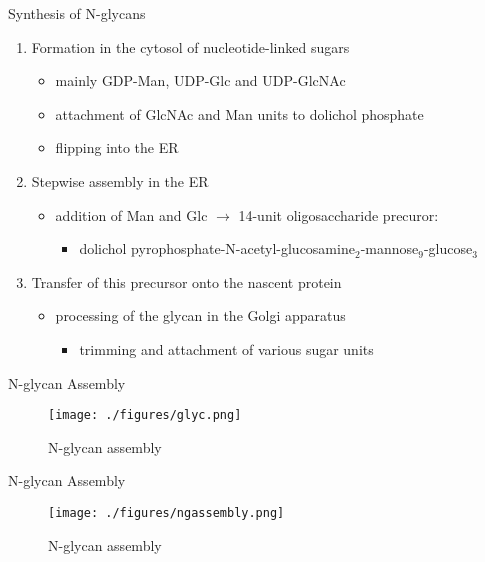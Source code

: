 \documentclass[presentation, smaller]{beamer}
\begin{document}
\begin{frame}[label={sec:orgbd9805b}]{Synthesis of N-glycans}
\begin{enumerate}
\item Formation in the cytosol of nucleotide-linked sugars
\begin{itemize}
\item mainly GDP-Man, UDP-Glc and UDP-GlcNAc
\item attachment of GlcNAc and Man units to dolichol phosphate
\item flipping into the ER
\end{itemize}
\item Stepwise assembly in the ER
\begin{itemize}
\item addition of Man and Glc \(\to\) 14-unit oligosaccharide precuror:
\begin{itemize}
\item dolichol pyrophosphate-N-acetyl-glucosamine\(_{\text{2}}\)-mannose\(_{\text{9}}\)-glucose\(_{\text{3}}\)
\end{itemize}
\end{itemize}
\item Transfer of this precursor onto the nascent protein
\begin{itemize}
\item processing of the glycan in the Golgi apparatus
\begin{itemize}
\item trimming and attachment of various sugar units
\end{itemize}
\end{itemize}
\end{enumerate}
\end{frame}

\begin{frame}[label={sec:org7aa24f7}]{N-glycan Assembly}
\begin{figure}[htbp]
\centering
\texttt{[image: ./figures/glyc.png]}
\caption{\label{fig:org2a382c6}
N-glycan assembly}
\end{figure}
\end{frame}


\begin{frame}[label={sec:org2e24bf5}]{N-glycan Assembly}
\begin{figure}[htbp]
\centering
\texttt{[image: ./figures/ngassembly.png]}
\caption{\label{fig:org7296e42}
N-glycan assembly}
\end{figure}
\end{frame}
\end{document}
